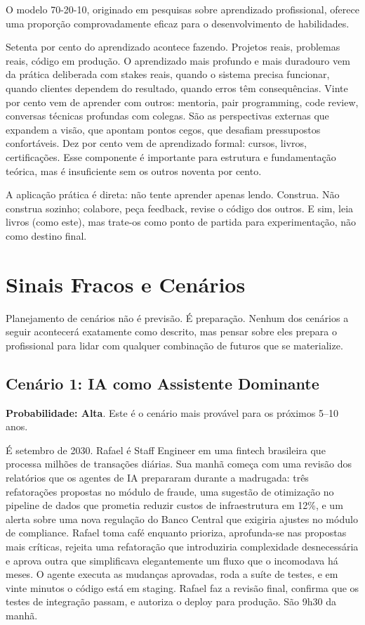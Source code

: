 O modelo 70-20-10, originado em pesquisas sobre aprendizado profissional, oferece uma proporção comprovadamente eficaz para o desenvolvimento de habilidades.

Setenta por cento do aprendizado acontece fazendo. Projetos reais, problemas reais, código em produção. O aprendizado mais profundo e mais duradouro vem da prática deliberada com stakes reais, quando o sistema precisa funcionar, quando clientes dependem do resultado, quando erros têm consequências. Vinte por cento vem de aprender com outros: mentoria, pair programming, code review, conversas técnicas profundas com colegas. São as perspectivas externas que expandem a visão, que apontam pontos cegos, que desafiam pressupostos confortáveis. Dez por cento vem de aprendizado formal: cursos, livros, certificações. Esse componente é importante para estrutura e fundamentação teórica, mas é insuficiente sem os outros noventa por cento.

A aplicação prática é direta: não tente aprender apenas lendo. Construa. Não construa sozinho; colabore, peça feedback, revise o código dos outros. E sim, leia livros (como este), mas trate-os como ponto de partida para experimentação, não como destino final.

\section{Sinais Fracos e Cenários}

Planejamento de cenários não é previsão. É preparação. Nenhum dos cenários a seguir acontecerá exatamente como descrito, mas pensar sobre eles prepara o profissional para lidar com qualquer combinação de futuros que se materialize.

\subsection{Cenário 1: IA como Assistente Dominante}

\textbf{Probabilidade: Alta}. Este é o cenário mais provável para os próximos
5--10 anos.

É setembro de 2030. Rafael é Staff Engineer em uma fintech brasileira que processa milhões de transações diárias. Sua manhã começa com uma revisão dos relatórios que os agentes de IA prepararam durante a madrugada: três refatorações propostas no módulo de fraude, uma sugestão de otimização no pipeline de dados que prometia reduzir custos de infraestrutura em 12\%, e um alerta sobre uma nova regulação do Banco Central que exigiria ajustes no módulo de compliance. Rafael toma café enquanto prioriza, aprofunda-se nas propostas mais críticas, rejeita uma refatoração que introduziria complexidade desnecessária e aprova outra que simplificava elegantemente um fluxo que o incomodava há meses. O agente executa as mudanças aprovadas, roda a suíte de testes, e em vinte minutos o código está em staging. Rafael faz a revisão final, confirma que os testes de integração passam, e autoriza o deploy para produção. São 9h30 da manhã.

